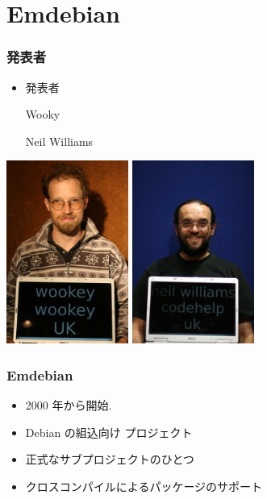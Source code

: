 \documentclass[cjk,dvipdfmx,12pt]{beamer}
\begin{document}
\section{Emdebian}
\begin{frame}
\frametitle{発表者} 
  \begin{minipage}{0.3\hsize}
    \begin{itemize}
      \item 発表者

	Wooky

        Neil Williams
    \end{itemize}
  \end{minipage}
  \begin{minipage}{0.6\hsize}
    \includegraphics[width=4cm]{image200707/wookey.jpg}
    \includegraphics[width=4cm]{image200707/codehelp.jpg}  
  \end{minipage}

\end{frame}

\begin{frame} 
\frametitle{Emdebian}
  \begin{itemize}
    \item 2000 年から開始.
    \item Debian の組込向け プロジェクト
    \item 正式なサブプロジェクトのひとつ
    \item クロスコンパイルによるパッケージのサポート 
  \end{itemize}
\end{frame}
\end{document}
